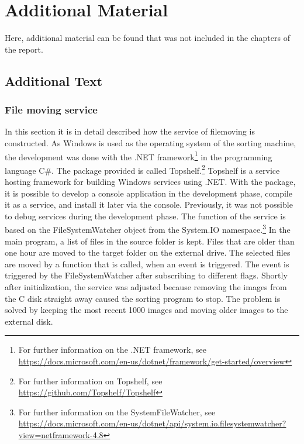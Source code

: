 \section{Additional Material}
\label{apx:AdditionalFigures}

Here, additional material can be found that was not included in the chapters of the report.

\subsection{Additional Text}
\label{sec:AddText}

\subsubsection{File moving service}
\label{subsec:FileService}

In this section it is in detail described how the service of filemoving is constructed. As Windows is used as the operating system of the sorting machine, the development was done with the .NET framework\footnote{For further information on the .NET framework, see \url{https://docs.microsoft.com/en-us/dotnet/framework/get-started/overview}} in the programming language C\#. The package provided is called Topshelf.\footnote{For further information on Topshelf, see \url{https://github.com/Topshelf/Topshelf}} Topshelf is a service hosting framework for building Windows services using .NET. With the package, it is possible to develop a console application in the development phase, compile it as a service, and install it later via the console. Previously, it was not possible to debug services during the development phase. The function of the service is based on the FileSystemWatcher object from the System.IO namespace.\footnote{For further information on the SystemFileWatcher, see \url{https://docs.microsoft.com/en-us/dotnet/api/system.io.filesystemwatcher?view=netframework-4.8}} In the main program, a list of files in the source folder is kept. Files that are older than one hour are moved to the target folder on the external drive. The selected files are moved by a function that is called, when an event is triggered. The event is triggered by the FileSystemWatcher after subscribing to different flags. Shortly after initialization, the service was adjusted because removing the images from the C disk straight away caused the sorting program to stop. The problem is solved by keeping the most recent 1000 images and moving older images to the external disk.



